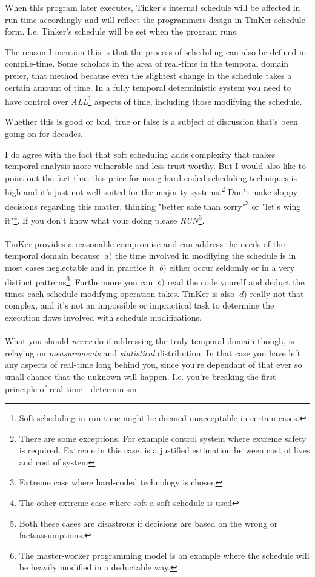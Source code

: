 When this program later executes, Tinker's internal schedule will be affected in run-time accordingly and will reflect the programmers design in TinKer schedule form. I.e. Tinker's schedule will be set when the program runs. 

The reason I mention this is that the process of scheduling can also be defined in compile-time. Some scholars in the area of real-time in the temporal domain prefer, that method because even the slightest change in the schedule takes a certain amount of time. In a fully temporal deterministic system you need to have control over \textit{ALL}\footnote{Soft scheduling in run-time might be deemed unacceptable in certain cases.} aspects of time, including those modifying the schedule.

Whether this is good or bad, true or false is a subject of discussion that's been going on for decades.

I do agree with the fact that soft scheduling adds complexity that makes temporal analysis more vulnerable and less trust-worthy. But I would also like to point out the fact that this price for using hard coded scheduling techniques is high and it's just not well suited for the majority systems.\footnote{There are some exceptions. For example control system where extreme safety is required. Extreme in this case, is a justified estimation between cost of lives and cost of system} Don't make sloppy decisions regarding this matter, thinking "better safe than sorry"\footnote{Extreme case where hard-coded technology is chosen} or "let's wing it"\footnote{The other extreme case where soft a soft schedule is used}. If you don't know what your doing please \textit{RUN}\footnote{Both these cases are disastrous if decisions are based on the wrong or factsassumptions.}.
\\\\
TinKer provides a reasonable compromise and can address the needs of the temporal domain because $~{a)}$ the time involved in modifying the schedule is in most cases neglectable and in practice it $~{b)}$ either occur seldomly or in a very distinct patterns\footnote{The master-worker programming model is an example where the schedule will be heavily modified in a deductable way.}. Furthermore you can $~{c)}$ read the code yourelf and deduct the times each schedule modifying operation takes. TinKer is also $~{d)}$ really not that complex, and it's not an impossible or impractical task to determine the execution flows involved with schedule modifications.
\\\\
What you should \textit{never} do if addressing the truly temporal domain though, is relaying on \textit{measurements} and \textit{statistical} distribution. In that case you have left any aspects of real-time long behind you, since you're dependant of that ever so small chance that the unknown will happen. I.e. you're breaking the first principle of real-time - determinism.


